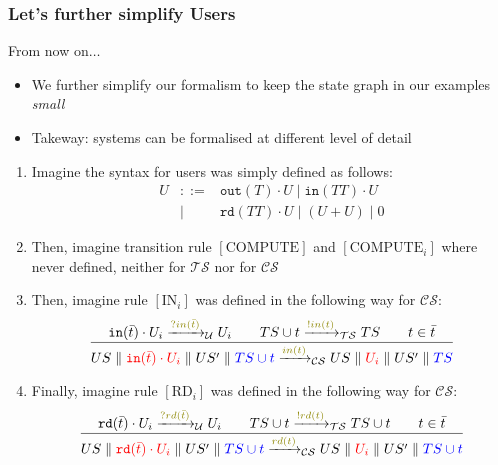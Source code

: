 \documentclass[presentation]{beamer}\mode<presentation>{\usetheme{AMSCesenaPurpleAndGold}}
\begin{document}
\begin{frame}[allowframebreaks]
\frametitle{Let's further simplify Users}

     \begin{block}{From now on$\ldots$}
         \begin{itemize}
             \item We further simplify our formalism to keep the state graph in our examples \emph{small}
             \item Takeway: systems can be formalised at different \alert{level of detail}
         \end{itemize}
     \end{block}

     \bigskip

    \begin{enumerate}
        \item Imagine the syntax for users was simply defined as follows:
        \[\begin{array}{rcl}
            U &::=& \mathtt{out}(T) \cdot U \mid \mathtt{in}(TT) \cdot U \\
            &\mid& \mathtt{rd}(TT) \cdot U \mid (U + U) \mid 0
        \end{array}\]
        
        \bigskip
        
        \item Then, imagine transition rule $[\text{COMPUTE}]$ and $[\text{COMPUTE}_i]$ where never defined, neither for $\mathcal{TS}$ nor for $\mathcal{CS}$
        
        \bigskip
        
        \item Then, imagine rule $[\text{IN}_i]$ was defined in the following way for $\mathcal{CS}$:
        \[
    		\frac{
    			\mathtt{in}(\bar t) \cdot U_i \xrightarrow{\highlightG{?in(\bar t)}}_\mathcal{U} U_i 
    			\qquad
    			TS \cup t \xrightarrow{\highlightG{!in(t)}}_\mathcal{TS} TS
    			\qquad
    			t \in \bar{t}
    		}{
    			US \parallel \highlightR{\mathtt{in}(\bar t) \cdot U_i} \parallel US' \parallel \highlightB{TS \cup t}
    			\xrightarrow{\highlightG{in(t)}}_\mathcal{CS}
    			US \parallel \highlightR{U_i} \parallel US' \parallel \highlightB{TS}
    		}
    	\]
        
        \bigskip
        
        \item Finally, imagine rule $[\text{RD}_i]$ was defined in the following way for $\mathcal{CS}$:
        \[
    		\frac{
    			\mathtt{rd}(\bar t) \cdot U_i \xrightarrow{\highlightG{?rd(\bar t)}}_\mathcal{U} U_i 
    			\qquad
    			TS \cup t \xrightarrow{\highlightG{!rd(t)}}_\mathcal{TS} TS \cup t
    			\qquad
    			t \in \bar{t}
    		}{
    			US \parallel \highlightR{\mathtt{rd}(\bar t) \cdot U_i} \parallel US' \parallel \highlightB{TS \cup t}
    			\xrightarrow{\highlightG{rd(t)}}_\mathcal{CS}
    			US \parallel \highlightR{U_i} \parallel US' \parallel \highlightB{TS \cup t}
    		} 
    	\]
    \end{enumerate}
\end{frame}
\end{document}
